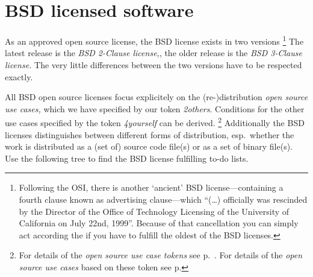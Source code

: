%
%
%
%
%



\section{BSD licensed software}

As an approved open source license, the BSD license exists in two
versions%
  \footnote{Following the OSI, there is another `ancient' BSD
    license---containing a fourth clause known as advertising clause---which
    \enquote{(\ldots) officially was rescinded by the Director of the Office of
      Technology Licensing of the University of California on July 22nd, 1999}. 
    Because of that cancellation you can simply act according the  
    \cite[cf.][\nopage wp.]{BsdLicense3Clause} 
    if you have to fulfill the oldest of the BSD licenses.}  
The latest release is the \textit{BSD 2-Clause license,}\citeBSDsimple{}, the
older release is the \textit{BSD 3-Clause license.}\citeBSDnew{} The very little
differences between the two versions have to be respected exactly. 

All BSD open source licenses focus explicitely on the (re-)distribution
\textit{open source use cases,} which we have specified by our token
\textit{2others}. Conditions for the other use cases specified by the token
\textit{4yourself} can be derived.%
  \footnote{For details of the \textit{open source use case tokens} see
    p.\ \pageref{OsucTokens}. For details of the \textit{open source use cases}
    based on these token see p. \pageref{OsucDefinitionTree}} 
Additionally the BSD licenses distinguishes between different forms of distribution,
esp.\ whether the work is distributed as a (set of) source code file(s) or as a
set of binary file(s). Use the following tree to find the BSD license fulfilling
to-do lists. 

